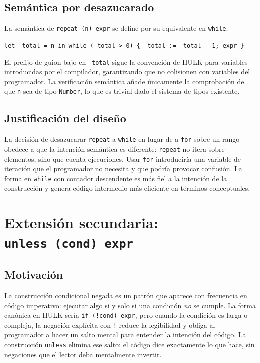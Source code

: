 \documentclass[12pt, a4paper]{article}
\begin{document}
\subsection{Semántica por desazucarado}

La semántica de \texttt{repeat~(n)~expr} se define por su equivalente en \texttt{while}:

\begin{center}
\texttt{let \_total = n in while (\_total > 0) \{ \_total := \_total - 1; expr \}}
\end{center}

El prefijo de guion bajo en \texttt{\_total} sigue la convención de HULK para variables introducidas por el compilador, garantizando que no colisionen con variables del programador. La verificación semántica añade únicamente la comprobación de que \texttt{n} sea de tipo \texttt{Number}, lo que es trivial dado el sistema de tipos existente.

\subsection{Justificación del diseño}

La decisión de desazucarar \texttt{repeat} a \texttt{while} en lugar de a \texttt{for} sobre un rango obedece a que la intención semántica es diferente: \texttt{repeat} no itera sobre elementos, sino que cuenta ejecuciones. Usar \texttt{for} introduciría una variable de iteración que el programador no necesita y que podría provocar confusión. La forma en \texttt{while} con contador descendente es más fiel a la intención de la construcción y genera código intermedio más eficiente en términos conceptuales.

\section{Extensión secundaria: \texttt{unless~(cond)~expr}}

\subsection{Motivación}

La construcción condicional negada es un patrón que aparece con frecuencia en código imperativo: ejecutar algo si y solo si una condición \emph{no} se cumple. La forma canónica en HULK sería \texttt{if~(!cond)~expr}, pero cuando la condición es larga o compleja, la negación explícita con \texttt{!} reduce la legibilidad y obliga al programador a hacer un salto mental para entender la intención del código. La construcción \texttt{unless} elimina ese salto: el código dice exactamente lo que hace, sin negaciones que el lector deba mentalmente invertir.
\end{document}
